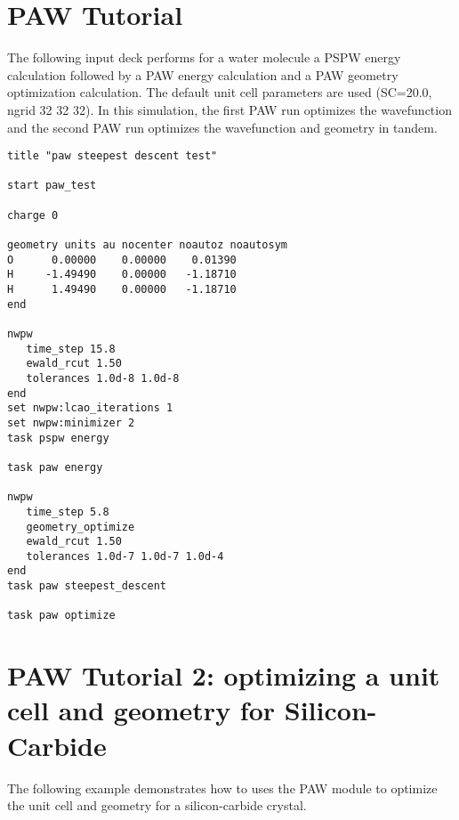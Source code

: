 \section{PAW Tutorial}
\label{sec:paw_tutorial}

The following input deck performs for a water molecule a PSPW energy calculation followed
by a PAW energy calculation and a PAW geometry optimization calculation.  
The default unit cell parameters are used (SC=20.0, ngrid 32 32 32).  In this simulation, the
first PAW run optimizes the wavefunction and the second PAW run optimizes the wavefunction
and geometry in tandem.

\begin{verbatim}
title "paw steepest descent test"

start paw_test

charge 0

geometry units au nocenter noautoz noautosym
O      0.00000    0.00000    0.01390
H     -1.49490    0.00000   -1.18710
H      1.49490    0.00000   -1.18710
end

nwpw
   time_step 15.8
   ewald_rcut 1.50
   tolerances 1.0d-8 1.0d-8
end
set nwpw:lcao_iterations 1
set nwpw:minimizer 2
task pspw energy

task paw energy

nwpw
   time_step 5.8
   geometry_optimize
   ewald_rcut 1.50
   tolerances 1.0d-7 1.0d-7 1.0d-4
end
task paw steepest_descent

task paw optimize
\end{verbatim}




\normalsize
\section{PAW Tutorial 2: optimizing a unit cell and geometry for Silicon-Carbide}
\label{sec:pspw_unitcell_optimization}

The following example demonstrates how to uses the PAW module to optimize the unit cell
and geometry for a silicon-carbide crystal.


